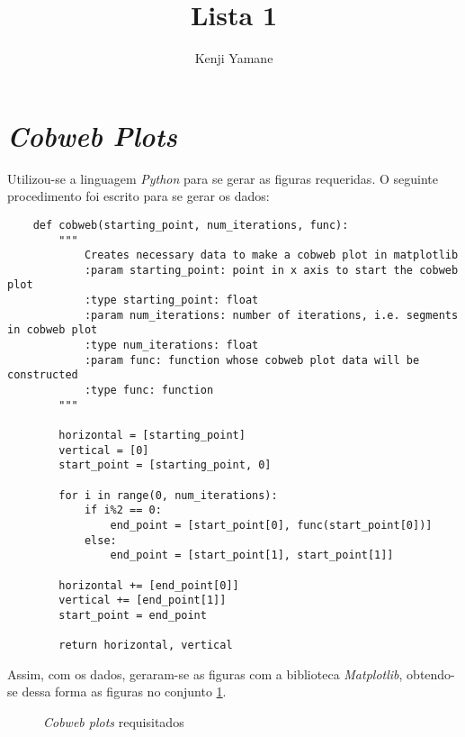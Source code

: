 \documentclass{article}[twocolumn]
\title{Lista 1}
\author{Kenji Yamane}
\begin{document}
	\maketitle
	\newpage
	\section{\textit{Cobweb Plots}}
	Utilizou-se a linguagem \textit{Python} para se gerar as figuras requeridas. O seguinte
	procedimento foi escrito para se gerar os dados:
	\begin{verbatim}
	def cobweb(starting_point, num_iterations, func):
    	"""
        	Creates necessary data to make a cobweb plot in matplotlib
        	:param starting_point: point in x axis to start the cobweb plot
        	:type starting_point: float
        	:param num_iterations: number of iterations, i.e. segments in cobweb plot
        	:type num_iterations: float
        	:param func: function whose cobweb plot data will be constructed
        	:type func: function
    	"""
    
    	horizontal = [starting_point]
    	vertical = [0]
    	start_point = [starting_point, 0]
    
    	for i in range(0, num_iterations):
        	if i%2 == 0:
            	end_point = [start_point[0], func(start_point[0])]
        	else:
            	end_point = [start_point[1], start_point[1]]
    
    	horizontal += [end_point[0]]
    	vertical += [end_point[1]]
    	start_point = end_point
    	
    	return horizontal, vertical
	\end{verbatim}
	Assim, com os dados, geraram-se as figuras com a biblioteca \textit{Matplotlib},
	obtendo-se dessa forma as figuras no conjunto \ref{fig:cobweb}.
	\begin{figure}[H]
		\centering
		\begin{subfigure} {
			\texttt{[image: cobweb1.jpg]}
		} \end{subfigure}
		\begin{subfigure} {
			\texttt{[image: cobweb2.jpg]}
		} \end{subfigure}
		\caption{\textit{Cobweb plots} requisitados}
		\label{fig:cobweb}
	\end{figure}
\end{document}
